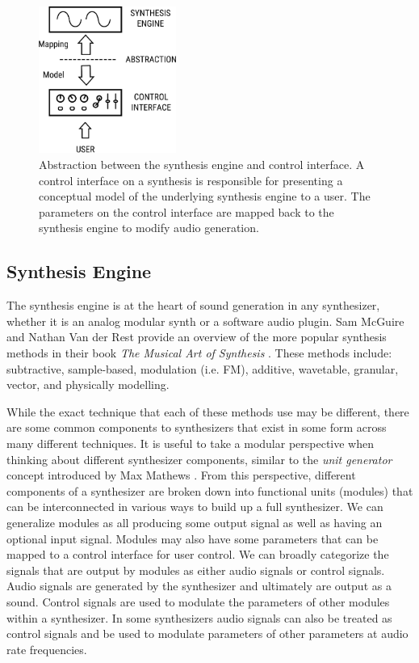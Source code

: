 \begin{figure}[ht]
    \centering
    \includegraphics[width=0.4\textwidth]{figures/background/Synth Abstraction Model.pdf}
    \caption{Abstraction between the synthesis engine and control interface. A control interface on a synthesis is responsible for presenting a conceptual model of the underlying synthesis engine to a user. The parameters on the control interface are mapped back to the synthesis engine to modify audio generation.}
    \label{fig:synth_abstraction}
\end{figure}

\subsection{Synthesis Engine}
The synthesis engine is at the heart of sound generation in any synthesizer, whether it is an analog modular synth or a software audio plugin. Sam McGuire and Nathan Van der Rest provide an overview of the more popular synthesis methods in their book \textit{The Musical Art of Synthesis} \cite{mcguire2015musical}. These methods include: subtractive, sample-based, modulation (i.e. FM), additive, wavetable, granular, vector, and physically modelling. 

While the exact technique that each of these methods use may be different, there are some common components to synthesizers that exist in some form across many different techniques. It is useful to take a modular perspective when thinking about different synthesizer components, similar to the \textit{unit generator} concept introduced by Max Mathews \cite{roads1980interview}. From this perspective, different components of a synthesizer are broken down into functional units (modules) that can be interconnected in various ways to build up a full synthesizer. We can generalize modules as all producing some output signal as well as having an optional input signal. Modules may also have some parameters that can be mapped to a control interface for user control. We can broadly categorize the signals that are output by modules as either audio signals or control signals. Audio signals are generated by the synthesizer and ultimately are output as a sound. Control signals are used to modulate the parameters of other modules within a synthesizer. In some synthesizers audio signals can also be treated as control signals and be used to modulate parameters of other parameters at audio rate frequencies.

